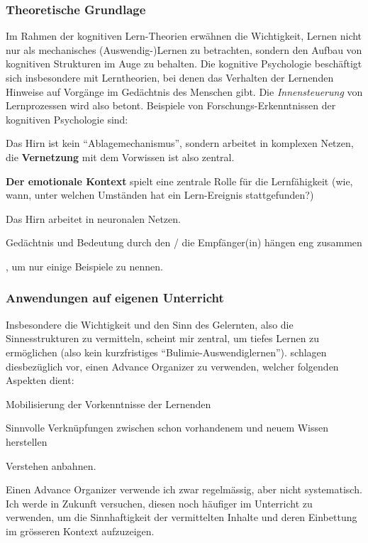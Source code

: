 \begin{myExBox}[title=Sinnvolles Lernen mit \textit{Advance Organizer}]
\subsubsection*{Theoretische Grundlage}
Im Rahmen der kognitiven Lern-Theorien erwähnen  \textcite{alma99117228235505511} die Wichtigkeit, Lernen nicht nur als mechanisches (Auswendig-)Lernen zu betrachten, sondern den Aufbau von kognitiven Strukturen im Auge zu behalten. Die kognitive Psychologie beschäftigt sich insbesondere mit Lerntheorien, bei denen das Verhalten der Lernenden Hinweise auf Vorgänge im Gedächtnis des Menschen gibt. Die \textit{Innensteuerung} von Lernprozessen wird also betont. Beispiele von Forschungs-Erkenntnissen der kognitiven Psychologie sind: \begin{enumerate*}
\item Das Hirn ist kein \enquote{Ablagemechanismus}, sondern arbeitet in komplexen Netzen, die \textbf{Vernetzung} mit dem Vorwissen ist also zentral.
\item \textbf{Der emotionale Kontext} spielt eine zentrale Rolle für die Lernfähigkeit (wie, wann, unter welchen Umständen hat ein Lern-Ereignis stattgefunden?)
\item Das Hirn arbeitet in neuronalen Netzen.
\item Gedächtnis und Bedeutung durch den / die Empfänger(in) hängen eng zusammen
\end{enumerate*}, um nur einige Beispiele zu nennen. 

\subsubsection*{Anwendungen auf eigenen Unterricht} Insbesondere die Wichtigkeit und den Sinn des Gelernten, also die Sinnesstrukturen zu vermitteln, scheint mir zentral, um tiefes Lernen zu ermöglichen (also kein kurzfristiges \enquote{Bulimie-Auswendiglernen}). \textcite{alma99117228235505511} schlagen diesbezüglich vor, einen Advance Organizer zu verwenden, welcher folgenden Aspekten dient:
\begin{enumerate*}
\item Mobilisierung der Vorkenntnisse der Lernenden
\item Sinnvolle Verknüpfungen zwischen schon vorhandenem und neuem Wissen herstellen
\item Verstehen anbahnen.
\end{enumerate*}
Einen Advance Organizer verwende ich zwar regelmässig, aber nicht systematisch. Ich werde in Zukunft versuchen, diesen noch häufiger im Unterricht zu verwenden, um die Sinnhaftigkeit der vermittelten Inhalte und deren Einbettung im grösseren Kontext aufzuzeigen.
\end{myExBox}

